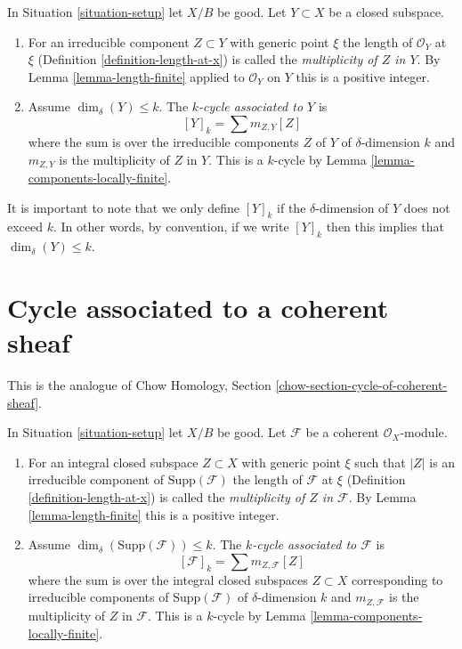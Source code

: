 \begin{definition}
\label{definition-cycle-associated-to-closed-subscheme}
In Situation \ref{situation-setup} let $X/B$ be good.
Let $Y \subset X$ be a closed subspace.
\begin{enumerate}
\item For an irreducible component $Z \subset Y$ with generic point $\xi$
the length of $\mathcal{O}_Y$ at $\xi$
(Definition \ref{definition-length-at-x}) is called the
{\it multiplicity of $Z$ in $Y$}.
By Lemma \ref{lemma-length-finite} applied to $\mathcal{O}_Y$
on $Y$ this is a positive integer.
\item Assume $\dim_\delta(Y) \leq k$.
The {\it $k$-cycle associated to $Y$} is
$$
[Y]_k = \sum m_{Z, Y}[Z]
$$
where the sum is over the irreducible components $Z$ of $Y$
of $\delta$-dimension $k$ and $m_{Z, Y}$ is the multiplicity
of $Z$ in $Y$.
This is a $k$-cycle by Lemma \ref{lemma-components-locally-finite}.
\end{enumerate}
\end{definition}

\noindent
It is important to note that we only define $[Y]_k$ if the $\delta$-dimension
of $Y$ does not exceed $k$. In other words, by convention, if we write
$[Y]_k$ then this implies that $\dim_\delta(Y) \leq k$.







\section{Cycle associated to a coherent sheaf}
\label{section-cycle-of-coherent-sheaf}

\noindent
This is the analogue of
Chow Homology, Section \ref{chow-section-cycle-of-coherent-sheaf}.

\begin{definition}
\label{definition-cycle-associated-to-coherent-sheaf}
In Situation \ref{situation-setup} let $X/B$ be good.
Let $\mathcal{F}$ be a coherent $\mathcal{O}_X$-module.
\begin{enumerate}
\item For an integral closed subspace $Z \subset X$ with generic point $\xi$
such that $|Z|$ is an irreducible component of $\text{Supp}(\mathcal{F})$
the length of $\mathcal{F}$ at $\xi$ (Definition \ref{definition-length-at-x})
is called the {\it multiplicity of $Z$ in $\mathcal{F}$}.
By Lemma \ref{lemma-length-finite} this is a positive integer.
\item Assume $\dim_\delta(\text{Supp}(\mathcal{F})) \leq k$.
The {\it $k$-cycle associated to $\mathcal{F}$} is
$$
[\mathcal{F}]_k = \sum m_{Z, \mathcal{F}}[Z]
$$
where the sum is over the integral closed subspaces $Z \subset X$
corresponding to irreducible components of
$\text{Supp}(\mathcal{F})$ of $\delta$-dimension $k$
and $m_{Z, \mathcal{F}}$ is the multiplicity of $Z$ in $\mathcal{F}$.
This is a $k$-cycle by Lemma \ref{lemma-components-locally-finite}.
\end{enumerate}
\end{definition}


